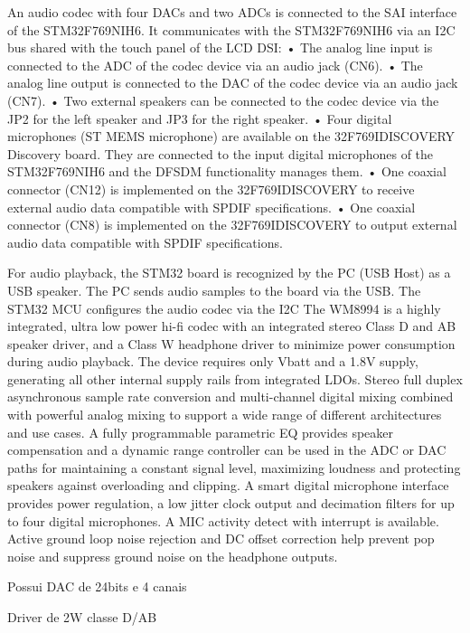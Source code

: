 \color{red}
An audio codec with four DACs and two ADCs is connected to the SAI interface of the
STM32F769NIH6. It communicates with the STM32F769NIH6 via an I2C bus shared with
the touch panel of the LCD DSI:
• The analog line input is connected to the ADC of the codec device via an audio jack
(CN6).
• The analog line output is connected to the DAC of the codec device via an audio jack
(CN7).
• Two external speakers can be connected to the codec device via the JP2 for the left
speaker and JP3 for the right speaker.
• Four digital microphones (ST MEMS microphone) are available on the
32F769IDISCOVERY Discovery board. They are connected to the input digital
microphones of the STM32F769NIH6 and the DFSDM functionality manages them.
• One coaxial connector (CN12) is implemented on the 32F769IDISCOVERY to receive
external audio data compatible with SPDIF specifications.
• One coaxial connector (CN8) is implemented on the 32F769IDISCOVERY to output
external audio data compatible with SPDIF specifications.

For audio playback, the STM32 board is recognized by the PC (USB Host) as a USB
speaker. The PC sends audio samples to the board via the USB. The STM32 MCU
configures the audio codec via the I2C
The WM8994 is a highly integrated, ultra low power hi-fi codec with an integrated stereo Class D and AB speaker driver, and a Class W headphone driver to minimize power consumption during audio playback. The device requires only Vbatt and a 1.8V supply, generating all other internal supply rails from integrated LDOs. Stereo full duplex asynchronous sample rate conversion and multi-channel digital mixing combined with powerful analog mixing to support a wide range of different architectures and use cases. A fully programmable parametric EQ provides speaker compensation and a dynamic range controller can be used in the ADC or DAC paths for maintaining a constant signal level, maximizing loudness and protecting speakers against overloading and clipping. A smart digital microphone interface provides power regulation, a low jitter clock output and decimation filters for up to four digital microphones. A MIC activity detect with interrupt is available. Active ground loop noise rejection and DC offset correction help prevent pop noise and suppress ground noise on the headphone outputs.
\color{black}

\color{orange}
Possui DAC de 24bits e 4 canais

Driver de 2W classe D/AB
\color{black}

